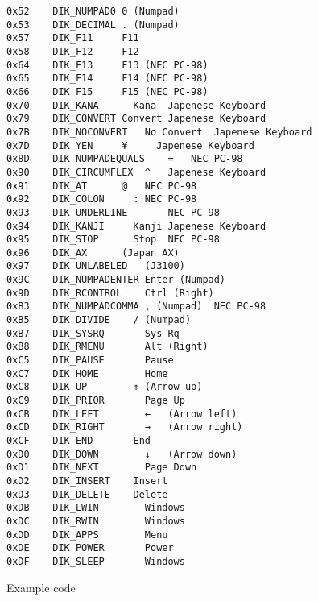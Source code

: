 \documentclass[
  openany]{book}
\begin{document}
\begin{verbatim}
0x52    DIK_NUMPAD0 0 (Numpad)  
0x53    DIK_DECIMAL . (Numpad)  
0x57    DIK_F11     F11 
0x58    DIK_F12     F12 
0x64    DIK_F13     F13 (NEC PC-98)
0x65    DIK_F14     F14 (NEC PC-98)
0x66    DIK_F15     F15 (NEC PC-98)
0x70    DIK_KANA      Kana  Japenese Keyboard
0x79    DIK_CONVERT Convert Japenese Keyboard
0x7B    DIK_NOCONVERT   No Convert  Japenese Keyboard
0x7D    DIK_YEN     ¥     Japenese Keyboard
0x8D    DIK_NUMPADEQUALS    =   NEC PC-98
0x90    DIK_CIRCUMFLEX  ^   Japenese Keyboard
0x91    DIK_AT      @   NEC PC-98
0x92    DIK_COLON     : NEC PC-98
0x93    DIK_UNDERLINE   _   NEC PC-98
0x94    DIK_KANJI     Kanji Japenese Keyboard
0x95    DIK_STOP      Stop  NEC PC-98
0x96    DIK_AX      (Japan AX)  
0x97    DIK_UNLABELED   (J3100) 
0x9C    DIK_NUMPADENTER Enter (Numpad)  
0x9D    DIK_RCONTROL    Ctrl (Right)    
0xB3    DIK_NUMPADCOMMA , (Numpad)  NEC PC-98
0xB5    DIK_DIVIDE    / (Numpad)    
0xB7    DIK_SYSRQ       Sys Rq  
0xB8    DIK_RMENU       Alt (Right) 
0xC5    DIK_PAUSE       Pause   
0xC7    DIK_HOME        Home    
0xC8    DIK_UP        ↑ (Arrow up)
0xC9    DIK_PRIOR       Page Up 
0xCB    DIK_LEFT        ←   (Arrow left)
0xCD    DIK_RIGHT       →   (Arrow right)
0xCF    DIK_END       End   
0xD0    DIK_DOWN        ↓   (Arrow down)
0xD1    DIK_NEXT        Page Down   
0xD2    DIK_INSERT    Insert    
0xD3    DIK_DELETE    Delete    
0xDB    DIK_LWIN        Windows 
0xDC    DIK_RWIN        Windows 
0xDD    DIK_APPS        Menu    
0xDE    DIK_POWER       Power   
0xDF    DIK_SLEEP       Windows
\end{verbatim}

Example code
\end{document}
